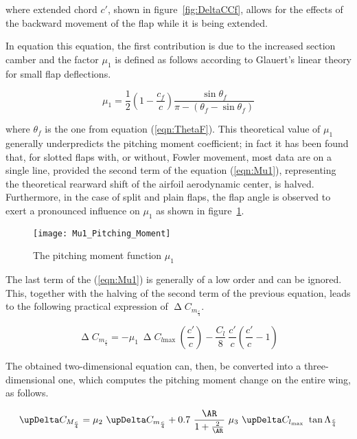 where extended chord $c'$, shown in figure~\ref{fig:DeltaCCf}, allows for the effects of the backward movement of the flap while it is being extended.

In equation this equation, the first contribution is due to the increased section camber and the factor $\mu_1$ is defined as follows according to Glauert's linear theory for small flap deflections.

\begin{equation}
\mu_1=\dfrac{1}{2}\left(1-\dfrac{c_f}{c}\right)\dfrac{\sin\theta_f}{\pi-\left(\theta_f-\sin\theta_f\right)}
\label{eqn:Mu1}
\end{equation}

where $\theta_f$ is the one from equation (\ref{eqn:ThetaF}). This theoretical value of $\mu_1$ generally underpredicts the pitching moment coefficient; in fact it has been found that, for slotted flaps with, or without, Fowler movement, most data are on a single line, provided the second term of the equation (\ref{eqn:Mu1}), representing the theoretical rearward shift of the airfoil aerodynamic center, is halved. Furthermore, in the case of split and plain flaps, the flap angle is observed to exert a pronounced influence on $\mu_1$ as shown in figure~\ref{fig:Mu1}.

\begin{figure}[!b]
  \centering
  \texttt{[image: Mu1\_Pitching\_Moment]}
  \caption{The pitching moment function $\mu_1$}
  \label{fig:Mu1}
\end{figure}

The last term of the (\ref{eqn:Mu1}) is generally of a low order and can be ignored. This, together with the halving of the second term of the previous equation, leads to the following practical expression of $\upDelta C_{m_{\frac{c}{4}}}$.

\begin{equation}
\upDelta C_{m_{\frac{c}{4}}}=-\mu_1\ \upDelta C_{l\text{max}}\ \left(\dfrac{c'}{c}\right)-\dfrac{C_l}{8}\ \dfrac{c'}{c}\left(\dfrac{c'}{c}-1\right)
\label{eqn:DeltaCmPractical}
\end{equation}

\bigskip
\noindent
The obtained two-dimensional equation can, then, be converted into a three-dimensional one, which computes the pitching moment change on the entire wing, as follows.

\begin{equation}
\upDelta C_{M_{\frac{c}{4}}}=\mu_2\ \upDelta C_{m_{\frac{c}{4}}}+0.7\ \dfrac{\AR}{1+\frac{2}{\AR}}\ \mu_3\ \upDelta C_{l_{\text{max}}}\ \tan\Lambda_{\frac{c}{4}}
\label{eqn:DeltaCM}
\end{equation}

